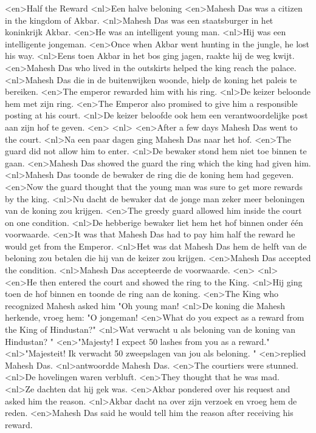 <en>Half the Reward
<nl>Een halve beloning
<en>Mahesh Das was a citizen in the kingdom of Akbar.
<nl>Mahesh Das was een staatsburger in het koninkrijk Akbar.
<en>He was an intelligent young man.
<nl>Hij was een intelligente jongeman.
<en>Once when Akbar went hunting in the jungle, he lost his way.
<nl>Eens toen Akbar in het bos ging jagen, raakte hij de weg kwijt.
<en>Mahesh Das who lived in the outskirts helped the king reach the palace.
<nl>Mahesh Das die in de buitenwijken woonde, hielp de koning het paleis te bereiken.
<en>The emperor rewarded him with his ring.
<nl>De keizer beloonde hem met zijn ring.
<en>The Emperor also promised to give him a responsible posting at his court.
<nl>De keizer beloofde ook hem een verantwoordelijke post aan zijn hof te geven.
<en>
<nl>
<en>After a few days Mahesh Das went to the court.
<nl>Na een paar dagen ging Mahesh Das naar het hof.
<en>The guard did not allow him to enter.
<nl>De bewaker stond hem niet toe  binnen te gaan.
<en>Mahesh Das showed the guard the ring which the king had given him.
<nl>Mahesh Das toonde de bewaker de ring die de koning hem had gegeven.
<en>Now the guard thought that the young man was sure to get more rewards by the king.
<nl>Nu dacht de bewaker dat de jonge man zeker meer beloningen van de koning zou krijgen.
<en>The greedy guard  allowed him inside the court on one condition.
<nl>De hebberige bewaker liet hem het hof  binnen onder één voorwaarde.
<en>It was that Mahesh Das had to pay him half the reward he would get from the Emperor.
<nl>Het was dat Mahesh Das hem de helft van de beloning zou betalen die hij van de keizer zou krijgen.
<en>Mahesh Das accepted the condition.
<nl>Mahesh Das accepteerde de voorwaarde.
<en>
<nl>
<en>He then entered the court and showed the ring to the King.
<nl>Hij ging toen de hof binnen en toonde de ring aan de koning.
<en>The King who recognized Mahesh asked him "Oh young man!
<nl>De koning die Mahesh herkende, vroeg hem: "O jongeman!
<en>What do you expect as a reward from the King of Hindustan?"
<nl>Wat verwacht u als beloning van de koning van Hindustan? "
<en>"Majesty! I expect 50 lashes from you as a reward."
<nl>"Majesteit! Ik verwacht 50 zweepslagen van jou als beloning. "
<en>replied Mahesh Das.
<nl>antwoordde Mahesh Das.
<en>The courtiers were stunned.
<nl>De hovelingen waren verbluft.
<en>They thought that he was mad.
<nl>Ze dachten dat hij gek was.
<en>Akbar pondered over his request and asked him the reason.
<nl>Akbar dacht na over zijn verzoek en vroeg hem de reden.
<en>Mahesh Das said he would tell him the reason after receiving his reward.

